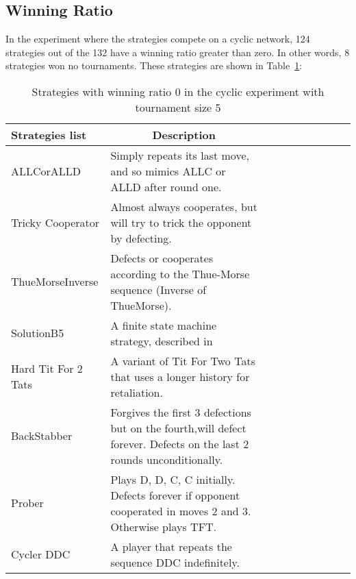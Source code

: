 \subsection{Winning Ratio}
\label{sub:winning-ratio}
In the experiment where the strategies compete on a cyclic network, 124 strategies
out of the 132 have a winning ratio greater than zero. In other words, 8 strategies
won no tournaments. These strategies are shown in Table~\ref{winning-ratio-zero-cyclic-five}:

\begin{table}[h]
	\centering
	\begin{adjustbox}{width=1\textwidth}
		\small
		\begin{tabular}{@{}|l|l|l|l|l|l|l|l|l|l|@{}}
			\hline
			\textbf{Strategies list}     & \multicolumn{1}{c|}{\textbf{Description}}                                                                                     \\ \hline
			ALLCorALLD          & Simply repeats its last move, and so mimics ALLC or ALLD after round one.                                            \\ \hline
			Tricky Cooperator   & Almost always cooperates, but will try to trick the opponent by defecting.                                           \\ \hline
			ThueMorseInverse    & Defects or cooperates according to the Thue-Morse sequence (Inverse of ThueMorse).                                   \\ \hline
			SolutionB5          & A finite state machine strategy, described in~\cite{Ashlock2015}                               \\ \hline
			Hard Tit For 2 Tats & A variant of Tit For Two Tats that uses a longer history for retaliation.                                            \\ \hline
			BackStabber         & Forgives the first 3 defections but on the fourth,will defect forever. Defects on the last 2 rounds unconditionally. \\ \hline
			Prober              & Plays D, D, C, C initially. Defects forever if opponent cooperated in moves 2 and 3. Otherwise plays TFT.            \\ \hline
			Cycler DDC          & A player that repeats the sequence DDC indefinitely.                                                                 \\ \hline
		\end{tabular}
	\end{adjustbox}
	\caption{Strategies with winning ratio 0 in the cyclic experiment with tournament
	size 5}
	\label{winning-ratio-zero-cyclic-five}
\end{table}

